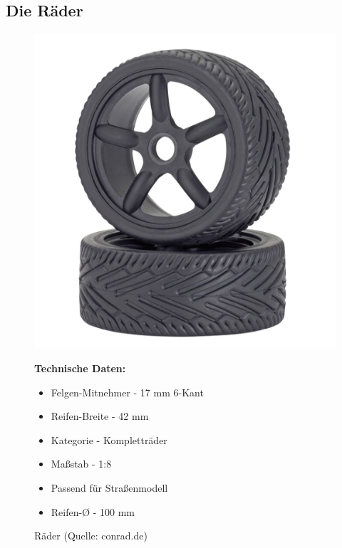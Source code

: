\subsection{Die Räder}

\begin{figure}[htb]
	\centering
	\begin{minipage}{0.49\linewidth}
		\centering
		\includegraphics[scale=0.5]{images/reifen.png}
		\caption{Räder \newline (Quelle: conrad.de)}
	\end{minipage}
	\begin{minipage}{0.4\linewidth}
		\textbf{Technische Daten:} 
		\begin{itemize} 
			\item Felgen-Mitnehmer - 17 mm 6-Kant
			\item Reifen-Breite - 42 mm
			\item Kategorie - Kompletträder
			\item Maßstab - 1:8 
			\item Passend für Straßenmodell
			\item Reifen-Ø - 100 mm
		\end{itemize}
	\end{minipage}
\end{figure}
\pagebreak

